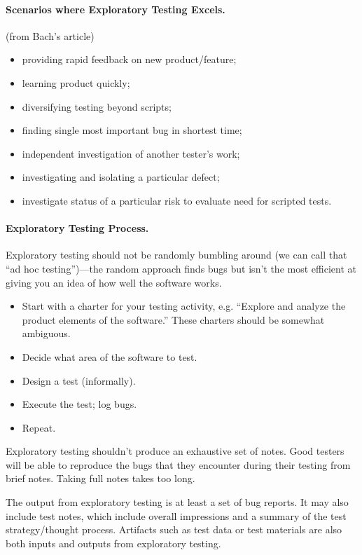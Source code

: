 \documentclass[11pt]{article}
\begin{document}
\paragraph{Scenarios where Exploratory Testing Excels.} (from Bach's article)
\begin{itemize}[noitemsep]
\item providing rapid feedback on new product/feature;
\item learning product quickly;
\item diversifying testing beyond scripts;
\item finding single most important bug in shortest time;
\item independent investigation of another tester's work;
\item investigating and isolating a particular defect;
\item investigate status of a particular risk to evaluate need for scripted tests.
\end{itemize}

\paragraph{Exploratory Testing Process.} Exploratory testing should not be
randomly bumbling around (we can call that ``ad hoc testing'')---the random
approach finds bugs but isn't the most efficient at giving you an idea of how well
the software works.

\begin{itemize}[noitemsep]
\item Start with a charter for your testing activity, e.g. ``Explore and analyze the product elements of the software.'' 
These charters should be somewhat ambiguous.
\item Decide what area of the software to test.
\item Design a test (informally).
\item Execute the test; log bugs.
\item Repeat.
\end{itemize}
Exploratory testing shouldn't produce an exhaustive set of notes. Good testers will
be able to reproduce the bugs that they encounter during their testing from brief notes.
Taking full notes takes too long.

The output from exploratory testing is at least a set of bug
reports. It may also include test notes, which include overall
impressions and a summary of the test strategy/thought
process. Artifacts such as test data or test materials are also both
inputs and outputs from exploratory testing.
\end{document}
